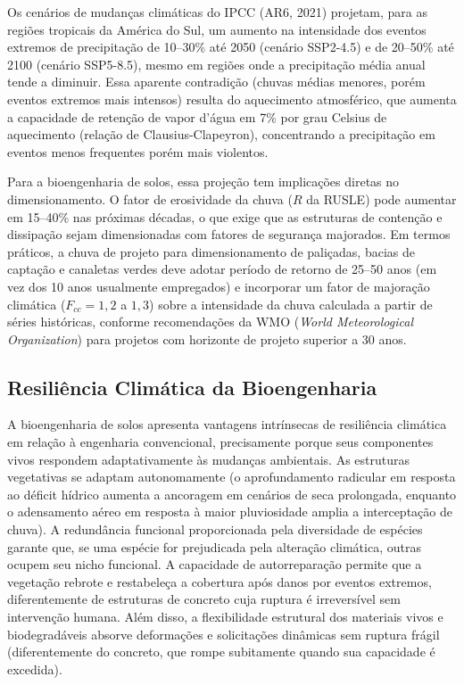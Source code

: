 \documentclass[
  portuguese,
  11pt,
  a4paper,
  open=any]{scrbook}
\begin{document}
Os cenários de mudanças climáticas do IPCC (AR6, 2021) projetam, para as
regiões tropicais da América do Sul, um aumento na intensidade dos
eventos extremos de precipitação de 10--30\% até 2050 (cenário SSP2-4.5)
e de 20--50\% até 2100 (cenário SSP5-8.5), mesmo em regiões onde a
precipitação média anual tende a diminuir. Essa aparente contradição
(chuvas médias menores, porém eventos extremos mais intensos) resulta do
aquecimento atmosférico, que aumenta a capacidade de retenção de vapor
d'água em 7\% por grau Celsius de aquecimento (relação de
Clausius-Clapeyron), concentrando a precipitação em eventos menos
frequentes porém mais violentos.

Para a bioengenharia de solos, essa projeção tem implicações diretas no
dimensionamento. O fator de erosividade da chuva (\(R\) da RUSLE) pode
aumentar em 15--40\% nas próximas décadas, o que exige que as estruturas
de contenção e dissipação sejam dimensionadas com fatores de segurança
majorados. Em termos práticos, a chuva de projeto para dimensionamento
de paliçadas, bacias de captação e canaletas verdes deve adotar período
de retorno de 25--50 anos (em vez dos 10 anos usualmente empregados) e
incorporar um fator de majoração climática (\(F_{cc} = 1{,}2\) a
\(1{,}3\)) sobre a intensidade da chuva calculada a partir de séries
históricas, conforme recomendações da WMO (\emph{World Meteorological
Organization}) para projetos com horizonte de projeto superior a 30
anos.

\subsection{Resiliência Climática da
Bioengenharia}\label{resiliuxeancia-climuxe1tica-da-bioengenharia}

A bioengenharia de solos apresenta vantagens intrínsecas de resiliência
climática em relação à engenharia convencional, precisamente porque seus
componentes vivos respondem adaptativamente às mudanças ambientais. As
estruturas vegetativas se adaptam autonomamente (o aprofundamento
radicular em resposta ao déficit hídrico aumenta a ancoragem em cenários
de seca prolongada, enquanto o adensamento aéreo em resposta à maior
pluviosidade amplia a interceptação de chuva). A redundância funcional
proporcionada pela diversidade de espécies garante que, se uma espécie
for prejudicada pela alteração climática, outras ocupem seu nicho
funcional. A capacidade de autorreparação permite que a vegetação
rebrote e restabeleça a cobertura após danos por eventos extremos,
diferentemente de estruturas de concreto cuja ruptura é irreversível sem
intervenção humana. Além disso, a flexibilidade estrutural dos materiais
vivos e biodegradáveis absorve deformações e solicitações dinâmicas sem
ruptura frágil (diferentemente do concreto, que rompe subitamente quando
sua capacidade é excedida).
\end{document}

